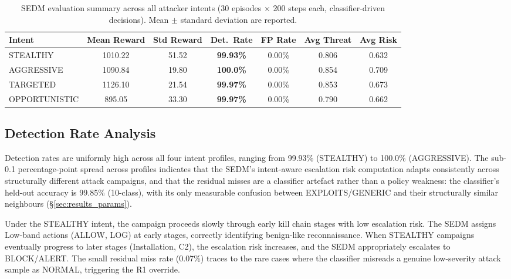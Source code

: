 \begin{table}[ht]
  \centering
  \caption{SEDM evaluation summary across all attacker intents
           (30 episodes $\times$ 200 steps each, classifier-driven decisions).
           Mean $\pm$ standard deviation are reported.}
  \label{tab:eval_summary}
  \begin{tabular}{lcccccc}
    \toprule
    Intent & Mean Reward & Std Reward & Det.\ Rate & FP Rate & Avg Threat & Avg Risk \\
    \midrule
    STEALTHY      & 1010.22 & 51.52 & \textbf{99.93\%} & 0.00\% & 0.806 & 0.632 \\
    AGGRESSIVE    & 1090.84 & 19.80 & \textbf{100.0\%} & 0.00\% & 0.854 & 0.709 \\
    TARGETED      & 1126.10 & 21.54 & \textbf{99.97\%} & 0.00\% & 0.853 & 0.673 \\
    OPPORTUNISTIC &  895.05 & 33.30 & \textbf{99.97\%} & 0.00\% & 0.790 & 0.662 \\
    \bottomrule
  \end{tabular}
\end{table}

\subsection{Detection Rate Analysis}

Detection rates are uniformly high across all four intent profiles,
ranging from 99.93\% (STEALTHY) to 100.0\% (AGGRESSIVE).
The sub-0.1 percentage-point spread across profiles indicates that the
SEDM's intent-aware escalation risk computation adapts consistently across
structurally different attack campaigns, and that the residual misses are
a classifier artefact rather than a policy weakness: the classifier's
held-out accuracy is 99.85\% (10-class), with its only measurable confusion
between EXPLOITS/GENERIC and their structurally similar neighbours
(\S\ref{sec:results_params}).

Under the STEALTHY intent, the campaign proceeds slowly through early kill
chain stages with low escalation risk.
The SEDM assigns Low-band actions (ALLOW, LOG) at early stages, correctly
identifying benign-like reconnaissance.
When STEALTHY campaigns eventually progress to later stages (Installation,
C2), the escalation risk increases, and the SEDM appropriately escalates
to BLOCK/ALERT.
The small residual miss rate (0.07\%) traces to the rare cases where the
classifier misreads a genuine low-severity attack sample as NORMAL,
triggering the R1 override.

